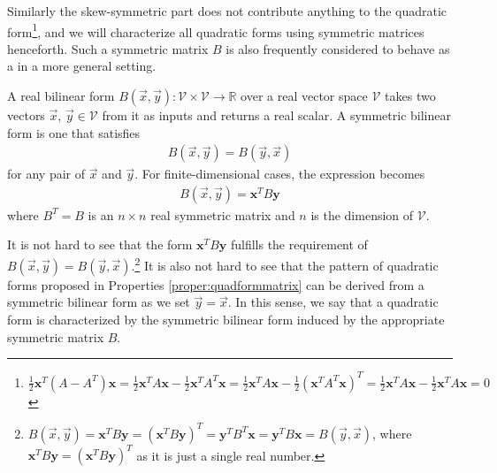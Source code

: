 Similarly the skew-symmetric part does not contribute anything to the quadratic form\footnote{$\frac{1}{2}\textbf{x}^T(A - A^T)\textbf{x} = \frac{1}{2}\textbf{x}^TA\textbf{x} - \frac{1}{2}\textbf{x}^TA^T\textbf{x} = \frac{1}{2}\textbf{x}^TA\textbf{x} - \frac{1}{2}(\textbf{x}^TA^T\textbf{x})^T = \frac{1}{2}\textbf{x}^TA\textbf{x} - \frac{1}{2}\textbf{x}^TA\textbf{x} = 0$}, and we will characterize all quadratic forms using symmetric matrices henceforth.
Such a symmetric matrix $B$ is also frequently considered to behave as a  in a more general setting.
\begin{defn}
A real bilinear form $B(\vec{x}, \vec{y}): \mathcal{V} \times \mathcal{V} \to \mathbb{R}$ over a real vector space $\mathcal{V}$ takes two vectors $\vec{x}$, $\vec{y} \in \mathcal{V}$ from it as inputs and returns a real scalar. A symmetric bilinear form is one that satisfies 
\begin{align}
B(\vec{x}, \vec{y}) = B(\vec{y}, \vec{x})    
\end{align} for any pair of $\vec{x}$ and $\vec{y}$. For finite-dimensional cases, the expression becomes
\begin{align}
B(\vec{x}, \vec{y}) = \textbf{x}^T B \textbf{y}    
\end{align}
where $B^T = B$ is an $n \times n$ real symmetric matrix and $n$ is the dimension of $\mathcal{V}$.
\end{defn}
It is not hard to see that the form $\textbf{x}^TB\textbf{y}$ fulfills the requirement of $B(\vec{x}, \vec{y}) = B(\vec{y}, \vec{x})$.\footnote{$B(\vec{x}, \vec{y}) = \textbf{x}^TB\textbf{y} = (\textbf{x}^TB\textbf{y})^T = \textbf{y}^TB^T\textbf{x} = \textbf{y}^TB\textbf{x} = B(\vec{y}, \vec{x})$, where $\textbf{x}^TB\textbf{y} = (\textbf{x}^TB\textbf{y})^T$ as it is just a single real number.} It is also not hard to see that the pattern of quadratic forms proposed in Properties \ref{proper:quadformmatrix} can be derived from a symmetric bilinear form as we set $\vec{y} = \vec{x}$. In this sense, we say that a quadratic form is characterized by the symmetric bilinear form induced by the appropriate symmetric matrix $B$.

